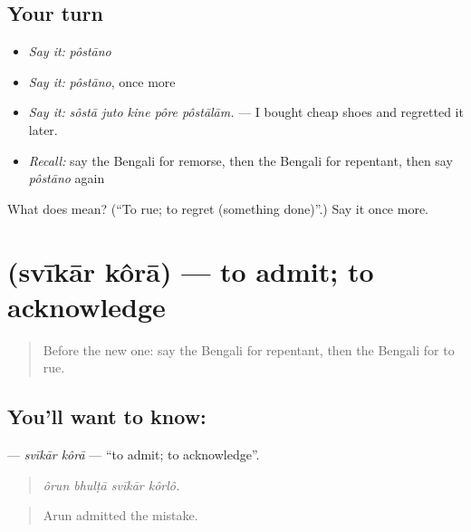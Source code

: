 \subsection*{Your turn}
\begin{itemize}
\raggedright
  \item \emph{Say it:} \emph{pôstāno}
  \item \emph{Say it:} \emph{pôstāno}, once more
  \item \emph{Say it:} \emph{sôstā juto kine pôre pôstālām.} — I bought cheap shoes and regretted it later.
  \item \emph{Recall:} say the Bengali for remorse, then the Bengali for repentant, then say \emph{pôstāno} again
\end{itemize}

\begin{tcolorbox}[breakable,colback=teal!4,colframe=teal!35!black,title={Before you move on}]
What does  mean? (\textquotedblleft{}To rue; to regret (something done)\textquotedblright{}.) Say it once more.
\end{tcolorbox}
\section[\texorpdfstring{\bn{স্বীকার} \bn{করা} (svīkār kôrā)}{স্বীকার করা (svīkār kôrā)}]{  (svīkār kôrā) — to admit; to acknowledge}

\label{lesson:BN-C447-svikar-kora}



\begin{quote}
Before the new one: say the Bengali for repentant, then the Bengali for to rue.
\end{quote}

\subsection*{You'll want to know:  }
\textbf{ } — \emph{svīkār kôrā} — \textquotedblleft{}to admit; to acknowledge\textquotedblright{}.

\begin{quote}
   
\end{quote}

\begin{quote}
\emph{ôrun bhulṭā svīkār kôrlô.}
\end{quote}

\begin{quote}
Arun admitted the mistake.
\end{quote}

